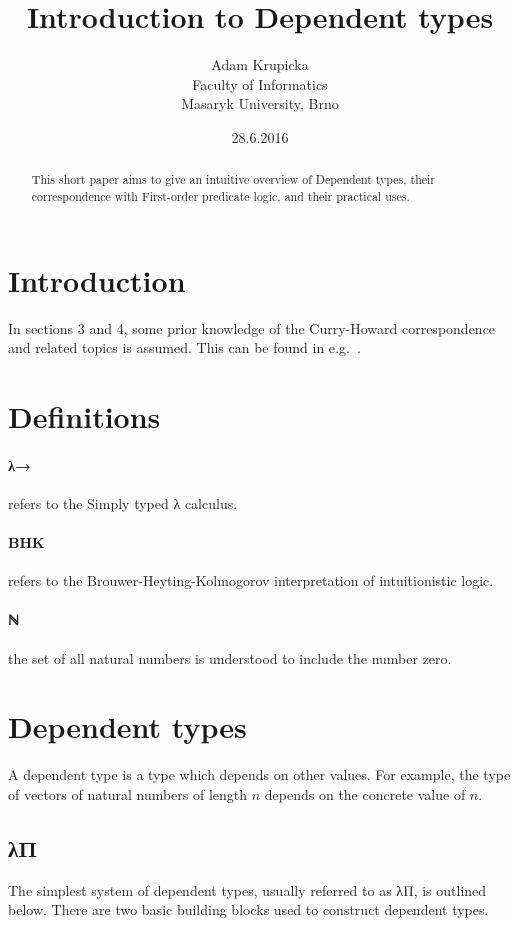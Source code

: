 \documentclass[12pt]{article}
\title{Introduction to Dependent types}
\author{Adam Krupicka\\
        Faculty of Informatics\\
        Masaryk University, Brno
}
\date{28.6.2016}
\begin{document}
\maketitle

\begin{abstract}
This short paper aims to give an intuitive overview of Dependent types, their correspondence with First-order predicate logic, and their practical uses.
\end{abstract} 

\section{Introduction}
In sections 3 and 4, some prior knowledge of the Curry-Howard correspondence and related topics is assumed. This can be found in e.g.~\cite{mcadams2013tutorial}.

\section{Definitions}
\paragraph{λ→} refers to the Simply typed λ calculus.

\paragraph{BHK} refers to the Brouwer-Heyting-Kolmogorov interpretation of intuitionistic logic.

\paragraph{ℕ} the set of all natural numbers is understood to include the number zero.

\newpage

\section{Dependent types}
A dependent type is a type which depends on other values. For example, the type of vectors of natural numbers of length $n$ depends on the concrete value of $n$.
\subsection{λΠ}
The simplest system of dependent types, usually referred to as λΠ, is outlined below. There are two basic building blocks used to construct dependent types.
\end{document}
